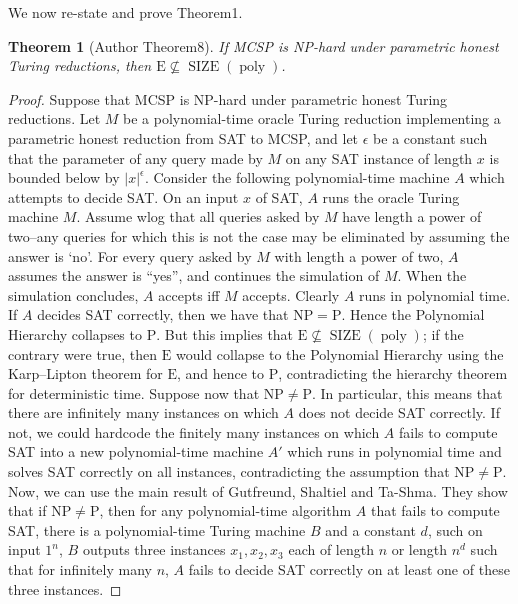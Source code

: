 \documentclass[10pt,a4paper]{article}
\newtheorem{nttheorem}{Theorem}
\newcommand{\SIZE}{\operatorname{SIZE}}
\newcommand{\poly}{\operatorname{poly}}
\begin{document}
We now re-state and prove Theorem1.
\begin{nttheorem}[Author Theorem8]
If MCSP is NP-hard under parametric honest Turing reductions, then $\mathrm E\not\subseteq\SIZE(\poly)$.
\end{nttheorem}
\begin{proof}
Suppose that MCSP is NP-hard under parametric honest Turing reductions. Let $M$ be a polynomial-time oracle Turing reduction implementing a parametric honest reduction from SAT to MCSP, and let $\epsilon$ be a constant such that the parameter of any query made by $M$ on any SAT instance of length $x$ is bounded below by $|x|^\epsilon$.
Consider the following polynomial-time machine $A$ which attempts to decide SAT. On an input $x$ of SAT, $A$ runs the oracle Turing machine $M$. Assume wlog that all queries asked by $M$ have length a power of two--any queries for which this is not the case may be eliminated by assuming the answer is `no'. For every query asked by $M$ with length a power of two, $A$ assumes the answer is ``yes'', and continues the simulation of $M$. When the simulation concludes, $A$ accepts iff $M$ accepts.
Clearly $A$ runs in polynomial time. If $A$ decides SAT correctly, then we have that $\mathrm{NP}=\mathrm P$. Hence the Polynomial Hierarchy collapses to $\mathrm P$. But this implies that $\mathrm E\not\subseteq\SIZE(\poly)$; if the contrary were true, then $\mathrm E$ would collapse to the Polynomial Hierarchy using the Karp--Lipton theorem for $\mathrm E$, and hence to $\mathrm P$, contradicting the hierarchy theorem for deterministic time.
Suppose now that $\mathrm{NP}\ne\mathrm P$. In particular, this means that there are infinitely many instances on which $A$ does not decide SAT correctly. If not, we could hardcode the finitely many instances on which $A$ fails to compute SAT into a new polynomial-time machine $A'$ which runs in polynomial time and solves SAT correctly on all instances, contradicting the assumption that $\mathrm{NP}\ne\mathrm P$.
Now, we can use the main result of Gutfreund, Shaltiel and Ta-Shma. They show that if $\mathrm{NP}\ne\mathrm P$, then for any polynomial-time algorithm $A$ that fails to compute SAT, there is a polynomial-time Turing machine $B$ and a constant $d$, such on input $1^n$, $B$ outputs three instances $x_1,x_2,x_3$ each of length $n$ or length $n^d$ such that for infinitely many $n$, $A$ fails to decide SAT correctly on at least one of these three instances.

\end{proof}
\end{document}
